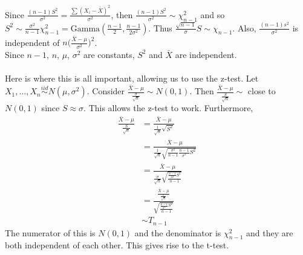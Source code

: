 \documentclass[12pt]{article}
\newcommand{\iid}{\stackrel{iid}{\sim}}
\begin{document}
Since $\frac{(n-1)S^2}{\sigma^2} = \frac{\sum (X_i - \bar{X})^2}{\sigma^2}$, then $\frac{(n-1)S^2}{\sigma^2} \sim \chi^2_{n-1}$ and so $S^2 \sim \frac{\sigma^2}{n-1}\chi^2_{n-1} = \text{Gamma}(\frac{n-1}{2}, \frac{n-1}{2\sigma^2})$. Thus $ \frac{\sqrt{n-1}}{\sigma}S \sim \chi_{n-1}$. Also, $\frac{(n-1)s^2}{\sigma^2}$ is independent of $n\Big( \frac{\bar{X} - \mu}{\sigma^2}\Big)^2$. \\
Since $n-1$, $n$, $\mu$, $\sigma^2$ are constants, $S^2$ and $\bar{X}$ are independent. \\~\\
Here is where this is all important, allowing us to use the z-test. Let $X_1, \dots, X_n \iid N(\mu, \sigma^2)$. Consider $\frac{\bar{X} - \mu}{\frac{\sigma}{\sqrt{n}}} \sim N(0,1)$. Then $\frac{\bar{X} - \mu}{\frac{S}{\sqrt{n}}} \sim $ close to $N(0,1)$ since $S \approx \sigma$. This allows the z-test to work. Furthermore, $$ \begin{aligned} \frac{\bar{X} - \mu}{\frac{S}{\sqrt{n}}} &= \frac{\bar{X} - \mu}{\frac{1}{\sqrt{n}}\sqrt{S^2}} \\ &= \frac{\bar{X} - \mu}{\frac{1}{\sqrt{n}} \sqrt{\frac{\sigma^2}{n-1}\frac{n-1}{\sigma^2}S^2}} \\ &= \frac{\bar{X} - \mu}{\frac{\sigma}{\sqrt{n}} \sqrt{\frac{\frac{n-1}{\sigma^2}S^2}{n-1}}} \\ &= \frac{\frac{\bar{X} - \mu}{\frac{\sigma}{\sqrt{n}}}}{\sqrt{\frac{\frac{n-1}{\sigma^2}S^2}{n-1}}} \\ &\sim T_{n-1} \end{aligned} $$ 
The numerator of this is $N(0,1)$ and the denominator is $\chi^2_{n-1}$ and they are both independent of each other. This gives rise to the t-test. \\~\\
\end{document}
